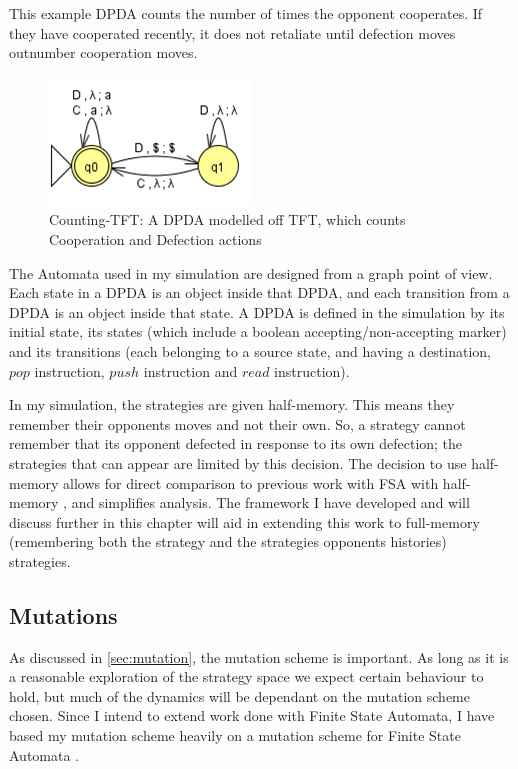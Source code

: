 \documentclass[a4paper,11pt,bcshonoursthesis,singlespace,oneside,thesisdraft,pdflatex]{cssethesis}
\begin{document}
This example DPDA counts the number of times the opponent cooperates. 
If they have cooperated recently, it does not retaliate until defection moves outnumber cooperation moves. 
\begin{figure}[h]
\centering
\includegraphics[scale=0.6]{pdatft}
\caption{Counting-TFT: A DPDA modelled off TFT, which counts Cooperation and Defection actions}
\label{fig:dpda}
\end{figure}
The Automata used in my simulation are designed from a graph point of view. 
Each state in a DPDA is an object inside that DPDA, and each transition from a DPDA is an object inside that state. 
A DPDA is defined in the simulation by its initial state, its states (which include a boolean accepting/non-accepting marker) and its transitions (each belonging to a source state, and having a destination, $pop$ instruction, $push$ instruction and $read$ instruction). 

In my simulation, the strategies are given half-memory. 
This means they remember their opponents moves and not their own. 
So, a strategy cannot remember that its opponent defected in response to its own defection; the strategies that can appear are limited by this decision. 
The decision to use half-memory allows for direct comparison to previous work with FSA with half-memory \citep{van-veelen:PNAS:2012}, and simplifies analysis. 
The framework I have developed and will discuss further in this chapter will aid in extending this work to full-memory (remembering both the strategy and the strategies opponents histories) strategies. 

\subsection{Mutations}
As discussed in \ref{sec:mutation}, the mutation scheme is important. As long as it is a reasonable exploration of the strategy space we expect certain behaviour to hold, but much of the dynamics will be dependant on the mutation scheme chosen. Since I intend to extend work done with Finite State Automata, I have based my mutation scheme heavily on a mutation scheme for Finite State Automata \citep{van-veelen:PNAS:2012}.
\end{document}
